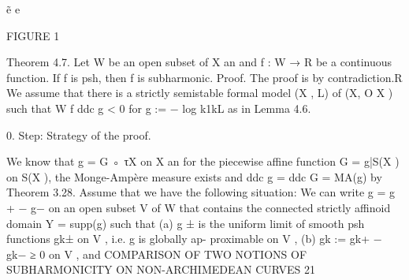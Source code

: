 \documentclass[
  10pt,
]{article}
\newenvironment{Shaded}{}{}
\newcommand{\NormalTok}[1]{#1}
\begin{document}
\begin{Shaded}
\begin{Highlighting}[]
\NormalTok{                                    ẽ                                   e}

\NormalTok{                                                FIGURE 1}

                                                                                                        
\NormalTok{Theorem 4.7. Let W be an open subset of X an and f : W → R be a continuous function.}
\NormalTok{If f is psh, then f is subharmonic.}
\NormalTok{Proof. The proof is by contradiction.R We assume that there is a strictly semistable formal}
\NormalTok{model (X , L) of (X, O X ) such that W f ddc g \textless{} 0 for g := − log k1kL as in Lemma 4.6.}

\NormalTok{     0. Step: Strategy of the proof.}

\NormalTok{  We know that g = G ◦ τX on X an for the piecewise affine function G = g|S(X ) on}
\NormalTok{S(X ), the Monge{-}Ampère measure exists and ddc g = ddc G = MA(g) by Theorem 3.28.}
\NormalTok{  Assume that we have the following situation: We can write g = g + − g− on an open}
\NormalTok{subset V of W that contains the connected strictly affinoid domain Y = supp(g) such}
\NormalTok{that}
\NormalTok{     (a) g ± is the uniform limit of smooth psh functions gk± on V , i.e. g is globally ap{-}}
\NormalTok{         proximable on V ,}
\NormalTok{     (b) gk := gk+ − gk− ≥ 0 on V , and}
\NormalTok{  COMPARISON OF TWO NOTIONS OF SUBHARMONICITY ON NON{-}ARCHIMEDEAN CURVES 21}



\end{Highlighting}
\end{Shaded}
\end{document}
